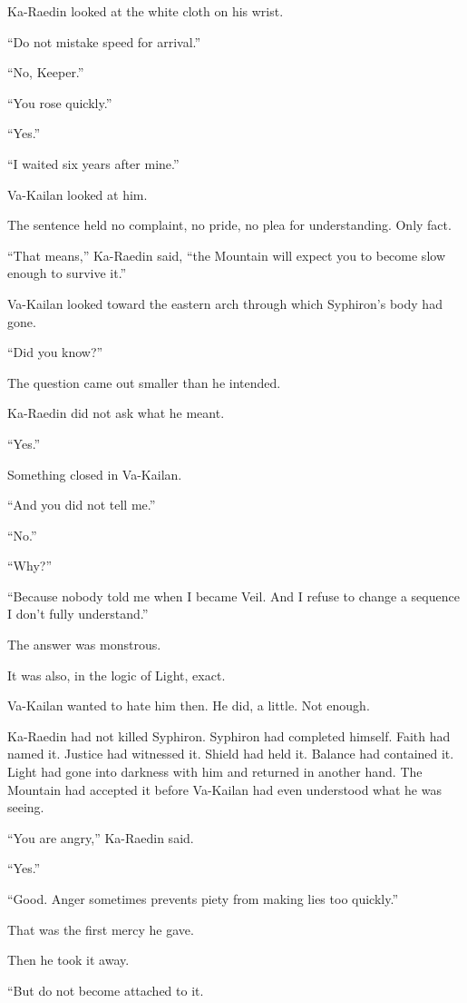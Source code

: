 Ka-Raedin looked at the white cloth on his wrist.\par
“Do not mistake speed for arrival.”\par
“No, Keeper.”\par
“You rose quickly.”\par
“Yes.”\par
“I waited six years after mine.”\par
Va-Kailan looked at him.\par
The sentence held no complaint, no pride, no plea for understanding.
Only fact.\par
“That means,” Ka-Raedin said, “the Mountain will expect you to become slow enough to survive it.”\par
Va-Kailan looked toward the eastern arch through which Syphiron’s body had gone.\par
“Did you know?”\par
The question came out smaller than he intended.\par
Ka-Raedin did not ask what he meant.\par
“Yes.”\par
Something closed in Va-Kailan.\par
“And you did not tell me.”\par
“No.”\par
“Why?”\par
“Because nobody told me when I became Veil. And I refuse to change a sequence I don't fully understand.”\par
The answer was monstrous.\par
It was also, in the logic of Light, exact.\par
Va-Kailan wanted to hate him then.
He did, a little.
Not enough.\par
Ka-Raedin had not killed Syphiron.
Syphiron had completed himself.
Faith had named it.
Justice had witnessed it.
Shield had held it.
Balance had contained it.
Light had gone into darkness with him and returned in another hand.
The Mountain had accepted it before Va-Kailan had even understood what he was seeing.\par
“You are angry,” Ka-Raedin said.\par
“Yes.”\par
“Good.
Anger sometimes prevents piety from making lies too quickly.”\par
That was the first mercy he gave.\par
Then he took it away.\par
“But do not become attached to it.
